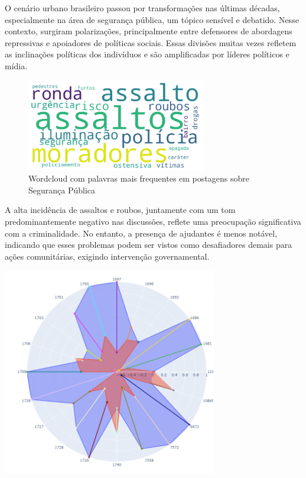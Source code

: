 O cenário urbano brasileiro passou por transformações nas últimas décadas, especialmente na área de segurança pública, um tópico sensível e debatido. Nesse contexto, surgiram polarizações, principalmente entre defensores de abordagens repressivas e apoiadores de políticas sociais. Essas divisões muitas vezes refletem as inclinações políticas dos indivíduos e são amplificadas por líderes políticos e mídia.

\begin{figure}[htb]
	\centering
	\includegraphics[width=0.7\textwidth]{images/wordcloud_security.png}
	\caption{Wordcloud com palavras mais frequentes em postagens sobre Segurança Pública}
	\label{fig:wordcloud_security}
\end{figure}

A alta incidência de assaltos e roubos, juntamente com um tom predominantemente negativo nas discussões, reflete uma preocupação significativa com a criminalidade. No entanto, a presença de ajudantes é menos notável, indicando que esses problemas podem ser vistos como desafiadores demais para ações comunitárias, exigindo intervenção governamental.

\begin{quadro}[htb]
	\centering
	\includegraphics[width=0.7\textwidth]{images/social_barometer_security.png}
	\caption{Gráfico de Radar ilustrando a pressão social em relação ao tópico de Segurança Pública.}
	\label{fig:social_barometer_security}
\end{quadro}


